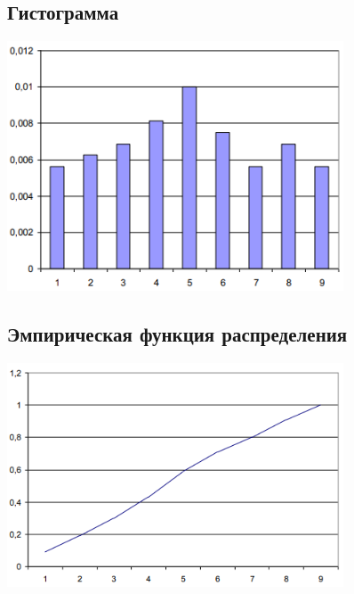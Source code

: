 \documentclass[12pt,a4paper]{report}
\begin{document}
\subsection*{Гистограмма}
\begin{center}
	\includegraphics[width=10cm]{histo.png}
\end{center}
\subsection*{Эмпирическая функция распределения}
\begin{center}
	\includegraphics[width=10cm]{function.png}
\end{center}
\end{document}
